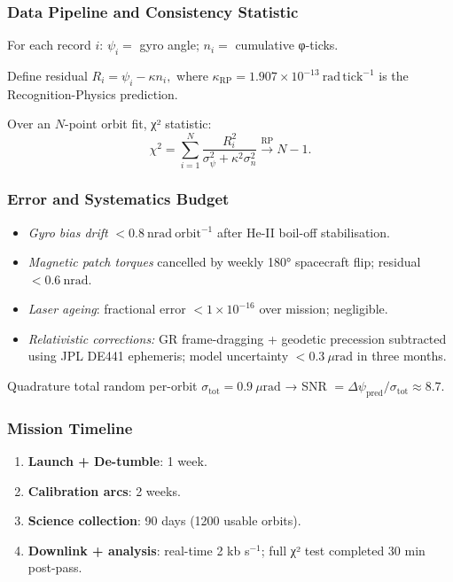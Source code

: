 \documentclass[11pt,oneside]{book}
\begin{document}
\subsubsection{Data Pipeline and Consistency Statistic}
\label{ss:phiSat-data}

For each record \(i\):
\(\psi_i =\) gyro angle; \(n_i =\) cumulative φ-ticks.

Define residual  
\(R_i = \psi_i - \kappa n_i,\)
where
\(\kappa_{\mathrm{RP}} = 1.907\times10^{-13}\ \mathrm{rad\,tick^{-1}}\)
is the Recognition-Physics prediction.

Over an \(N\)-point orbit fit, χ² statistic:
\[
   \chi^{2}
   = \sum_{i=1}^{N}
     \frac{R_i^{2}}{\sigma_{\psi}^{2}+\kappa^{2}\sigma_{n}^{2}}
   \overset{\text{RP}}{\longrightarrow} N\!-\!1.
\]

\subsubsection{Error and Systematics Budget}
\label{ss:phiSat-error}

\begin{itemize}[leftmargin=*,itemsep=2pt]
\item \emph{Gyro bias drift} \(<0.8\ \mathrm{nrad\ orbit^{-1}}\)
      after He-II boil-off stabilisation.
\item \emph{Magnetic patch torques} cancelled by weekly 180° spacecraft
      flip; residual \(<0.6\ \mathrm{nrad}\).
\item \emph{Laser ageing}: fractional error \(<1\times10^{-16}\)
      over mission; negligible.
\item \emph{Relativistic corrections:} GR frame-dragging +
      geodetic precession subtracted using JPL DE441 ephemeris; model
      uncertainty \(<0.3\ \mu\mathrm{rad}\) in three months.
\end{itemize}

Quadrature total random per-orbit
\(\sigma_{\mathrm{tot}} = 0.9\ \mu\mathrm{rad}\)
→ SNR \(= \Delta\psi_{\text{pred}}/\sigma_{\mathrm{tot}} \approx 8.7\).

\subsubsection{Mission Timeline}
\label{ss:phiSat-timeline}

\begin{enumerate}[label=\arabic*.,leftmargin=*,itemsep=2pt]
\item \textbf{Launch + De-tum­ble}: 1 week.
\item \textbf{Calibration arcs}: 2 weeks.
\item \textbf{Science collection}: 90 days (1200 usable orbits).
\item \textbf{Downlink + analysis}: real-time 2 kb s\(^{-1}\);
      full χ² test completed 30 min post-pass.
\end{enumerate}
\end{document}
